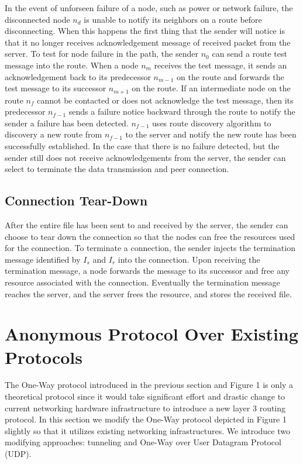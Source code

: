 In the event of unforseen failure of a node, such as power or network
failure, the disconnected node $n_d$ is unable to notify its neighbors on
a route before disconnecting. When this happens the first thing that the
sender will notice is that it no longer receives acknowledgement message
of received packet from the server. To test for node failure in the path,
the sender $n_0$ can send a route test message into the route. When a
node $n_m$ receives the test message, it sends an acknowledgement back to
its predecessor $n_{m-1}$ on the route and forwards the test message to
its successor $n_{m+1}$ on the route. If an intermediate node on the route
$n_f$ cannot be contacted or does not acknowledge the test message, then
its predecessor $n_{f-1}$ sends a failure notice backward through the route
to notify the sender a failure has been detected. $n_{f-1}$ uses route
discovery algorithm to discovery a new route from $n_{f-1}$ to the server
and notify the new route has been successfully established. In the case
that there is no failure detected, but the sender still does not receive
acknowledgements from the server, the sender can select to terminate the
data transmission and peer connection.

\subsection{Connection Tear-Down}

After the entire file has been sent to and received by the server, the
sender can choose to tear down the connection so that the nodes can free
the resources used for the connection. To terminate a connection, the
sender injects the termination message identified by $I_s$ and $I_r$ into
the connection. Upon receiving the termination message, a node forwards
the message to its successor and free any resource associated with the
connection. Eventually the termination message reaches the server, and the
server frees the resource, and stores the received file.


\section{Anonymous Protocol Over Existing Protocols}\label{sec-protocol}
The One-Way protocol introduced in the previous section and Figure 1 is only
a theoretical protocol since it would take significant effort and drastic
change to current networking hardware infrastructure to introduce a new layer 3
routing protocol. In this section we modify the One-Way protocol depicted in
Figure 1 slightly so that it utilizes existing networking infrastructures. We
introduce two modifying approaches: tunneling and One-Way over User Datagram
Protocol (UDP).

